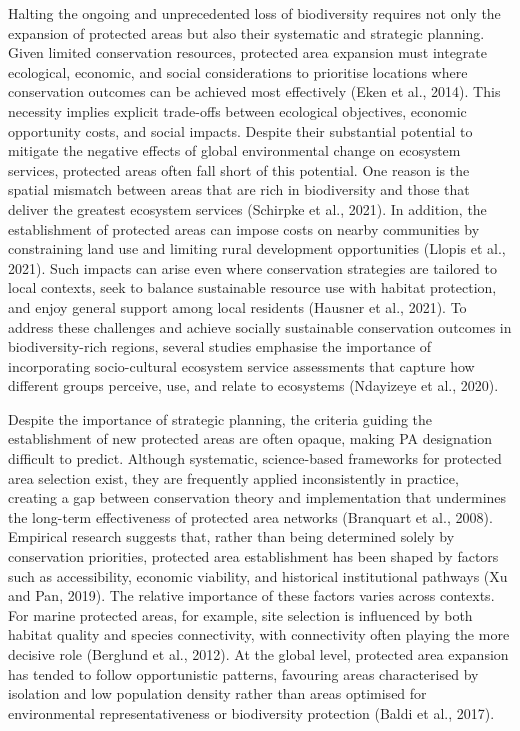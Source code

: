 \documentclass[12pt]{article}
\theoremstyle{break} %
\begin{document}
Halting the ongoing and unprecedented loss of biodiversity requires not only the expansion of protected areas but also their systematic and strategic planning. Given limited conservation resources, protected area expansion must integrate ecological, economic, and social considerations to prioritise locations where conservation outcomes can be achieved most effectively (Eken et al., 2014). This necessity implies explicit trade-offs between ecological objectives, economic opportunity costs, and social impacts. Despite their substantial potential to mitigate the negative effects of global environmental change on ecosystem services, protected areas often fall short of this potential. One reason is the spatial mismatch between areas that are rich in biodiversity and those that deliver the greatest ecosystem services (Schirpke et al., 2021). In addition, the establishment of protected areas can impose costs on nearby communities by constraining land use and limiting rural development opportunities (Llopis et al., 2021). Such impacts can arise even where conservation strategies are tailored to local contexts, seek to balance sustainable resource use with habitat protection, and enjoy general support among local residents (Hausner et al., 2021). To address these challenges and achieve socially sustainable conservation outcomes in biodiversity-rich regions, several studies emphasise the importance of incorporating socio-cultural ecosystem service assessments that capture how different groups perceive, use, and relate to ecosystems (Ndayizeye et al., 2020).

Despite the importance of strategic planning, the criteria guiding the establishment of new protected areas are often opaque, making PA designation difficult to predict. Although systematic, science-based frameworks for protected area selection exist, they are frequently applied inconsistently in practice, creating a gap between conservation theory and implementation that undermines the long-term effectiveness of protected area networks (Branquart et al., 2008). Empirical research suggests that, rather than being determined solely by conservation priorities, protected area establishment has been shaped by factors such as accessibility, economic viability, and historical institutional pathways (Xu and Pan, 2019). The relative importance of these factors varies across contexts. For marine protected areas, for example, site selection is influenced by both habitat quality and species connectivity, with connectivity often playing the more decisive role (Berglund et al., 2012). At the global level, protected area expansion has tended to follow opportunistic patterns, favouring areas characterised by isolation and low population density rather than areas optimised for environmental representativeness or biodiversity protection (Baldi et al., 2017).
\end{document}
